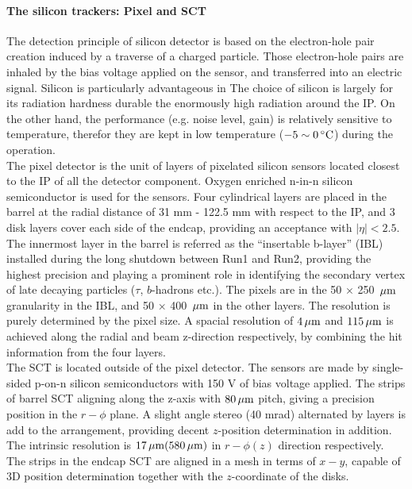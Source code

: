 \paragraph{The silicon trackers: Pixel and SCT} 
The detection principle of silicon detector is based on the electron-hole pair creation induced by a traverse of a charged particle.
Those electron-hole pairs are inhaled by the bias voltage applied on the sensor, and transferred into an electric signal. 
Silicon is particularly advantageous in 
The choice of silicon is largely for its radiation hardness durable the enormously high radiation around the IP. 
On the other hand, the performance (e.g. noise level, gain) is relatively sensitive to temperature, therefor they are kept in low temperature ($-5 \sim 0\, {}^\circ\mathrm{C}$) during the operation.  \\

The pixel detector is the unit of layers of pixelated silicon sensors located closest to the IP of all the detector component. 
Oxygen enriched n-in-n silicon semiconductor is used for the sensors.
Four cylindrical layers are placed in the barrel at the radial distance of 31 mm - 122.5 mm with respect to the IP, 
and 3 disk layers cover each side of the endcap, providing an acceptance with $|\eta|<2.5$. 
The innermost layer in the barrel is referred as the ``insertable b-layer'' (IBL) installed during the long shutdown between Run1 and Run2, providing the highest precision and playing a prominent role in identifying the secondary vertex of late decaying particles ($\tau$, $b$-hadrons etc.). 
The pixels are in the 50 $\times$ 250 $\, \mathrm{\mu m}$ granularity in the IBL, and 50 $\times$ 400 $\, \mathrm{\mu m}$ in the other layers. 
The resolution is purely determined by the pixel size. A spacial resolution of $4\, \mathrm{\mu m}$ and $115\, \mathrm{\mu m}$ is achieved along the radial and beam z-direction respectively, 
by combining the hit information from the four layers. \\

The SCT is located outside of the pixel detector. The sensors are made by single-sided p-on-n silicon semiconductors with 150 V of bias voltage applied. %
The strips of barrel SCT aligning along the z-axis with $80 \, \mathrm{\mu m}$ pitch, giving a precision position in the $r-\phi$ plane. 
A slight angle stereo (40 mrad) alternated by layers is add to the arrangement, providing decent $z$-position determination in addition. 
The intrinsic resolution is $17\, \mathrm{\mu m} (580 \, \mathrm{\mu m})$ in $r-\phi (z)$ direction respectively.
The strips in the endcap SCT are aligned in a mesh in terms of $x-y$, capable of 3D position determination together with the $z$-coordinate of the disks.

